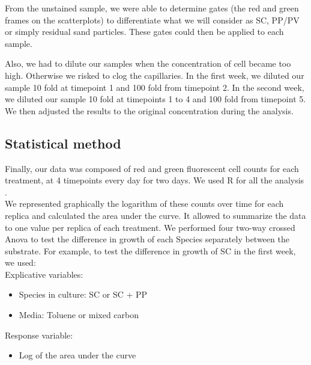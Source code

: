 \documentclass[a4paper, 10pt, conference]{ieeeconf}   %
\begin{document}
From the unstained sample, we were able to determine gates (the red and green frames on the scatterplots) to differentiate what we will consider as SC, PP/PV or simply residual sand particles. These gates could then be applied to each sample.

Also, we had to dilute our samples when the concentration of cell became too high. Otherwise we risked to clog the capillaries.
In the first week, we diluted our sample 10 fold at timepoint 1 and 100 fold from timepoint 2. In the second week, we diluted our sample 10 fold at timepoints 1 to 4 and 100 fold from timepoint 5.
We then adjusted the results to the original concentration during the analysis. 


\subsection{Statistical method}
Finally, our data was composed of red and green fluorescent cell counts for each treatment, at 4 timepoints every day for two days. We used R for all the analysis \cite{R}.\\
We represented graphically the logarithm of these counts over time for each replica and calculated the area under the curve. It allowed to summarize the data to one value per replica of each treatment.
We performed four two-way crossed Anova to test the difference in growth of each Species separately between the substrate. For example, to test the difference in growth of SC in the first week, we used: \\
Explicative variables:
\begin{itemize}
	\item Species in culture: SC or SC + PP
	\item Media: Toluene or mixed carbon
\end{itemize}
Response variable:
\begin{itemize}
	\item Log of the area under the curve
\end{itemize}
\end{document}
